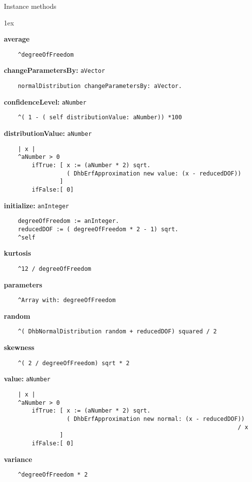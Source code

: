 Instance methods
{\parskip 1ex\par\noindent}
{\bf average}
\begin{verbatim}
    ^degreeOfFreedom

\end{verbatim}
{\bf changeParametersBy:} {\tt aVector}
\begin{verbatim}
    normalDistribution changeParametersBy: aVector.

\end{verbatim}
{\bf confidenceLevel:} {\tt aNumber}
\begin{verbatim}
    ^( 1 - ( self distributionValue: aNumber)) *100

\end{verbatim}
{\bf distributionValue:} {\tt aNumber}
\begin{verbatim}
    | x |
    ^aNumber > 0
        ifTrue: [ x := (aNumber * 2) sqrt.
                  ( DhbErfApproximation new value: (x - reducedDOF))
                ]
        ifFalse:[ 0]

\end{verbatim}
{\bf initialize:} {\tt anInteger}
\begin{verbatim}
    degreeOfFreedom := anInteger.
    reducedDOF := ( degreeOfFreedom * 2 - 1) sqrt.
    ^self

\end{verbatim}
{\bf kurtosis}
\begin{verbatim}
    ^12 / degreeOfFreedom

\end{verbatim}
{\bf parameters}
\begin{verbatim}
    ^Array with: degreeOfFreedom

\end{verbatim}
{\bf random}
\begin{verbatim}
    ^( DhbNormalDistribution random + reducedDOF) squared / 2

\end{verbatim}
{\bf skewness}
\begin{verbatim}
    ^( 2 / degreeOfFreedom) sqrt * 2

\end{verbatim}
{\bf value:} {\tt aNumber}
\begin{verbatim}
    | x |
    ^aNumber > 0
        ifTrue: [ x := (aNumber * 2) sqrt.
                  ( DhbErfApproximation new normal: (x - reducedDOF)) 
                                                                   / x
                ]
        ifFalse:[ 0]

\end{verbatim}
{\bf variance}
\begin{verbatim}
    ^degreeOfFreedom * 2

\end{verbatim}


